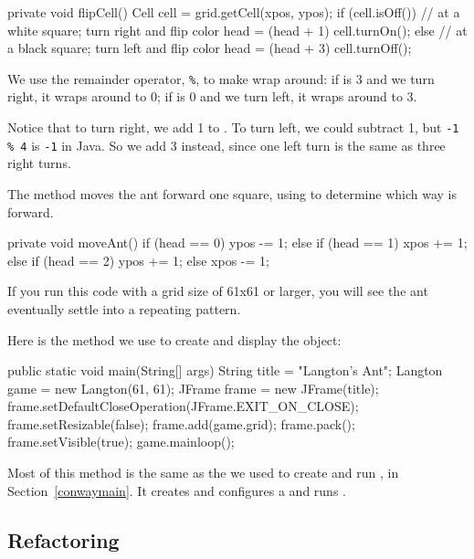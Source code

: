 \begin{code}
private void flipCell() {
    Cell cell = grid.getCell(xpos, ypos);
    if (cell.isOff()) {
        // at a white square; turn right and flip color
        head = (head + 1) %
        cell.turnOn();
    } else {
        // at a black square; turn left and flip color
        head = (head + 3) %
        cell.turnOff();
    }
}
\end{code}

We use the remainder operator, \verb"%", to make  wrap around: if  is 3 and we turn right, it wraps around to 0; if  is 0 and we turn left, it wraps around to 3.

Notice that to turn right, we add 1 to .
To turn left, we could subtract 1, but \verb"-1 % 4" is \verb"-1" in Java.
So we add 3 instead, since one left turn is the same as three right turns.

The  method moves the ant forward one square, using  to determine which way is forward.

\begin{code}
private void moveAnt() {
    if (head == 0) {
        ypos -= 1;
    } else if (head == 1) {
        xpos += 1;
    } else if (head == 2) {
        ypos += 1;
    } else {
        xpos -= 1;
    }
}
\end{code}

If you run this code with a grid size of 61x61 or larger, you will see the ant eventually settle into a repeating pattern.

Here is the  method we use to create and display the  object:

\begin{code}
public static void main(String[] args) {
    String title = "Langton's Ant";
    Langton game = new Langton(61, 61);
    JFrame frame = new JFrame(title);
    frame.setDefaultCloseOperation(JFrame.EXIT_ON_CLOSE);
    frame.setResizable(false);
    frame.add(game.grid);
    frame.pack();
    frame.setVisible(true);
    game.mainloop();
}
\end{code}

Most of this method is the same as the  we used to create and run , in Section~\ref{conwaymain}.
It creates and configures a  and runs .


\subsection*{Refactoring}

